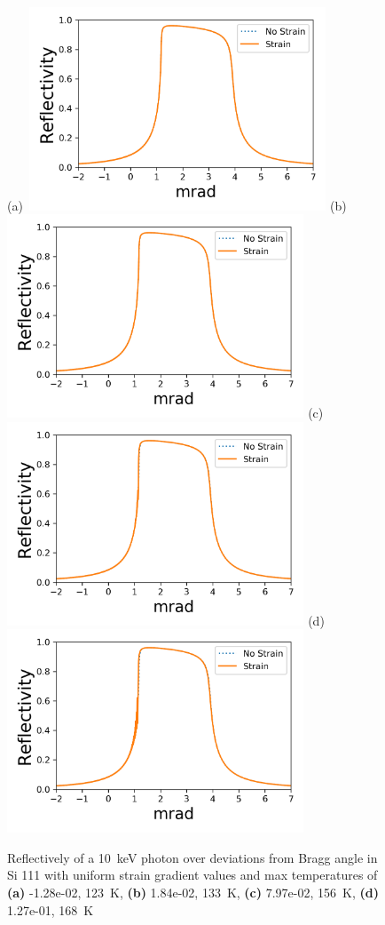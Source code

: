 \documentclass[preprint]{iucr}              %
\begin{document}
\begin{figure}
\caption{Reflectively of a 10~keV photon over deviations from Bragg angle in Si 111 with uniform strain gradient values and max temperatures of \textbf{(a)} -1.28e-02, 123~K, \textbf{(b)} 1.84e-02, 133~K, \textbf{(c)} 7.97e-02, 156~K, \textbf{(d)}  1.27e-01, 168~K}
(a)~\includegraphics[width = 8.85cm]{images/111_10keV_4.png}
(b)~\includegraphics[width = 8.85cm]{images/111_10keV_5.png}
(c)~\includegraphics[width = 8.85cm]{images/111_10keV_7.png}
(d)~\includegraphics[width = 8.85cm]{images/111_10keV_8.png}
\label{fig:111usg10kev}
\end{figure}
\end{document}
